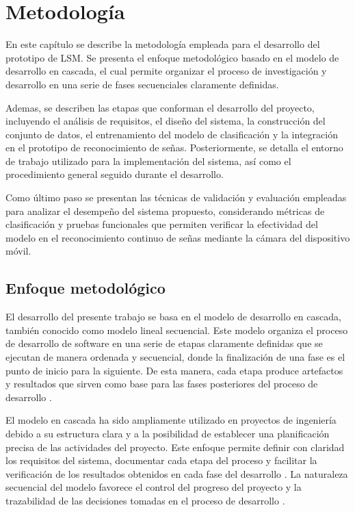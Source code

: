 	\chapter{Metodología}
	
	En este capítulo se describe la metodología empleada para el desarrollo del prototipo de LSM. Se presenta el enfoque metodológico basado en el modelo de desarrollo en cascada, el cual permite organizar el proceso de investigación y desarrollo en una serie de fases secuenciales claramente definidas.
	
	Ademas, se describen las etapas que conforman el desarrollo del proyecto, incluyendo el análisis de requisitos, el diseño del sistema, la construcción del conjunto de datos, el entrenamiento del modelo de clasificación y la integración en el prototipo de reconocimiento de señas. Posteriormente, se detalla el entorno de trabajo utilizado para la implementación del sistema, así como el procedimiento general seguido durante el desarrollo.
	
	Como último paso se presentan las técnicas de validación y evaluación empleadas para analizar el desempeño del sistema propuesto, considerando métricas de clasificación y pruebas funcionales que permiten verificar la efectividad del modelo en el reconocimiento continuo de señas mediante la cámara del dispositivo móvil.
	
	
	\section{Enfoque metodológico}
	
	El desarrollo del presente trabajo se basa en el modelo de desarrollo en cascada,
	también conocido como modelo lineal secuencial. Este modelo organiza el proceso
	de desarrollo de software en una serie de etapas claramente definidas que se
	ejecutan de manera ordenada y secuencial, donde la finalización de una fase es el punto de inicio para la siguiente. De esta manera, cada etapa
	produce artefactos y resultados que sirven como base para las fases posteriores
	del proceso de desarrollo \cite{pressman2014,sommerville2016}.
	
	El modelo en cascada ha sido ampliamente utilizado en proyectos de ingeniería debido a su estructura clara y a la posibilidad de establecer una
	planificación precisa de las actividades del proyecto. Este enfoque permite
	definir con claridad los requisitos del sistema, documentar cada etapa del
	proceso y facilitar la verificación de los resultados obtenidos en cada fase
	del desarrollo \cite{mall2018,jalote2005}. La naturaleza secuencial
	del modelo favorece el control del progreso del proyecto y la trazabilidad de
	las decisiones tomadas en el proceso de desarrollo \cite{fairley1985}.
	

